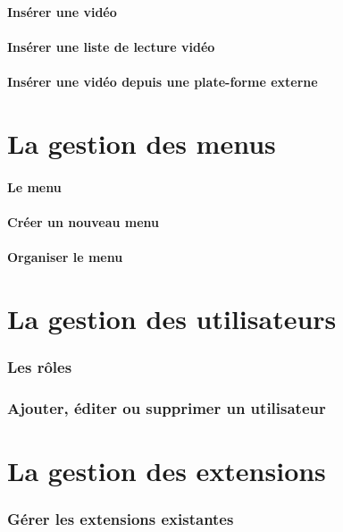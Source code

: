 \documentclass[10pt,a4paper]{article}
\begin{document}
\subsection{Insérer une vidéo}
\newpage
\subsection{Insérer une liste de lecture vidéo}
\newpage
\subsection{Insérer une vidéo depuis une plate-forme externe}
\newpage

\part{La gestion des menus}
\newpage

\subsection{Le menu}
\newpage
\subsection{Créer un nouveau menu}
\newpage
\subsection{Organiser le menu}
\newpage

\part{La gestion des utilisateurs}
\newpage
\section{Les rôles}
\newpage
\section{Ajouter, éditer ou supprimer un utilisateur}
\newpage

\part{La gestion des extensions}
\newpage

\section{Gérer les extensions existantes}
\newpage
\end{document}
